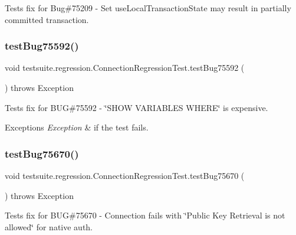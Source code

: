 Tests fix for Bug\#75209 -\/ Set use\+Local\+Transaction\+State may result in partially committed transaction. \mbox{\label{classtestsuite_1_1regression_1_1_connection_regression_test_a665407a24ed690a64058e8f86c4d6063}} 
\subsubsection{\texorpdfstring{test\+Bug75592()}{testBug75592()}}
{\footnotesize\ttfamily void testsuite.\+regression.\+Connection\+Regression\+Test.\+test\+Bug75592 (\begin{DoxyParamCaption}{ }\end{DoxyParamCaption}) throws Exception}

Tests fix for B\+UG\#75592 -\/ \char`\"{}\+S\+H\+O\+W V\+A\+R\+I\+A\+B\+L\+E\+S W\+H\+E\+R\+E\char`\"{} is expensive.


\begin{DoxyExceptions}{Exceptions}
{\em Exception} & if the test fails. \\
\hline
\end{DoxyExceptions}
\mbox{\label{classtestsuite_1_1regression_1_1_connection_regression_test_ae51a7e49df56ea469720a9d165fc124a}} 
\subsubsection{\texorpdfstring{test\+Bug75670()}{testBug75670()}}
{\footnotesize\ttfamily void testsuite.\+regression.\+Connection\+Regression\+Test.\+test\+Bug75670 (\begin{DoxyParamCaption}{ }\end{DoxyParamCaption}) throws Exception}

Tests fix for B\+UG\#75670 -\/ Connection fails with \char`\"{}\+Public Key Retrieval is not allowed\char`\"{} for native auth.

